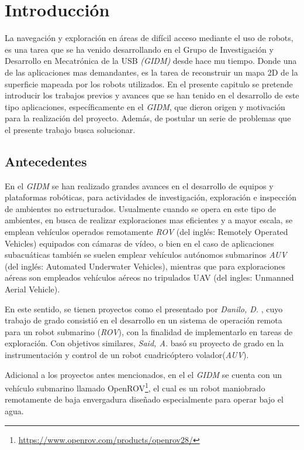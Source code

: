\chapter{Introducción}
\label{capitulo1}

La navegación y exploración en áreas de difícil acceso mediante el uso de robots, es una tarea que se ha venido desarrollando en el Grupo de Investigación y Desarrollo en Mecatrónica de la USB  \textit{(GIDM)} desde hace mu tiempo. Donde una de las aplicaciones mas demandantes, es la tarea de reconstruir un mapa 2D de la superficie mapeada por los robots utilizados. En el presente capitulo se pretende introducir los trabajos previos y avances que se han tenido en el desarrollo de este tipo aplicaciones, específicamente en el \textit{GIDM}, que dieron origen y motivación para la realización del proyecto. Además, de postular un serie de problemas que el presente trabajo busca solucionar.

\section{Antecedentes}

En el \textit{GIDM} se han realizado grandes avances en el desarrollo de equipos y plataformas robóticas, para actividades de investigación, exploración e inspección de ambientes no estructurados. Usualmente cuando se opera en este tipo de ambientes, en busca de realizar exploraciones mas eficientes y a mayor escala, se emplean vehículos operados remotamente \textit{ROV} (del inglés: Remotely Operated Vehicles) equipados con cámaras de vídeo, o bien en el caso de aplicaciones subacuáticas también se suelen emplear vehículos autónomos submarinos \textit{AUV} (del inglés: Automated Underwater Vehicles), mientras que para exploraciones aéreas son empleados vehículos aéreos no tripulados UAV (del ingles: Unmanned Aerial Vehicle).

En este sentido, se tienen proyectos como el presentado por \textit{Danilo, D.} \cite{danilo}, cuyo trabajo de grado consistió en el desarrollo en un sistema de operación remota para un robot submarino (\textit{ROV}), con la finalidad de implementarlo en tareas de exploración. Con objetivos similares, \textit{Said, A.} \cite{said} basó su proyecto de grado en la instrumentación y control de un robot cuadricóptero volador(\textit{AUV}). 

Adicional a los proyectos antes mencionados, en el el \textit{GIDM}  se cuenta con un vehículo submarino llamado OpenROV\footnote{ \url{https://www.openrov.com/products/openrov28/}}, el cual es un robot maniobrado remotamente de baja envergadura diseñado especialmente para operar bajo el agua.

